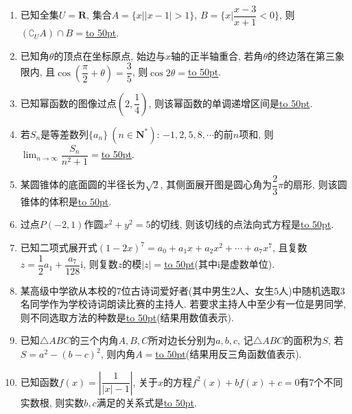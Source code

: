 \documentclass[10pt,a4paper]{article}
\newcommand{\blank}[1]{\underline{\hbox to #1pt{}}}
\begin{document}
\begin{enumerate}[1.]

\item 已知全集$U=\mathbf{R}$, 集合$A=\{x||x-1|>1\}$, $B=\{x|\dfrac{x-3}{x+1}<0\}$, 则$(\complement_U A)\cap B=$\blank{50}.
\item 已知角$\theta$的顶点在坐标原点, 始边与$x$轴的正半轴重合, 若角$\theta$的终边落在第三象限内, 且$\cos(\dfrac\pi 2+\theta)=\dfrac35$, 则$\cos 2\theta=$\blank{50}.
\item 已知幂函数的图像过点$(2,\dfrac14)$, 则该幂函数的单调递增区间是\blank{50}.
\item 若$S_n$是等差数列$\{a_n\}\ (n\in \mathbf{N}^*)$: $-1,2,5,8,\cdots$的前$n$项和, 则$\displaystyle\lim_{n\to\infty}\dfrac{{S_n}}{{n^2}+1}=$\blank{50}.
\item 某圆锥体的底面圆的半径长为$\sqrt2$, 其侧面展开图是圆心角为$\dfrac23\pi$的扇形, 则该圆锥体的体积是\blank{50}.
\item 过点$P(-2,1)$作圆$x^2+y^2=5$的切线, 则该切线的点法向式方程是\blank{50}.
\item 已知二项式展开式$(1-2x)^7=a_0+a_1x+a_2x^2+\cdots +a_7x^7$, 且复数$z=\dfrac12a_1+\dfrac{a_7}{128}\mathrm{i}$, 则复数$z$的模$|z|=$\blank{50}(其中$\mathrm{i}$是虚数单位).
\item 某高级中学欲从本校的$7$位古诗词爱好者(其中男生$2$人、女生$5$人)中随机选取$3$名同学作为学校诗词朗读比赛的主持人. 若要求主持人中至少有一位是男同学, 则不同选取方法的种数是\blank{50}(结果用数值表示).
\item 已知$\triangle ABC$的三个内角$A,B,C$所对边长分别为$a,b,c$, 记$\triangle ABC$的面积为$S$, 若$S=a^2-(b-c)^2$, 则内角$A=$\blank{50}(结果用反三角函数值表示).
\item 已知函数$f(x)=\left|\dfrac1{|x|-1}\right|$, 关于$x$的方程$f^2(x)+bf(x)+c=0$有$7$个不同实数根, 则实数$b,c$满足的关系式是\blank{50}.


\end{enumerate}
\end{document}
